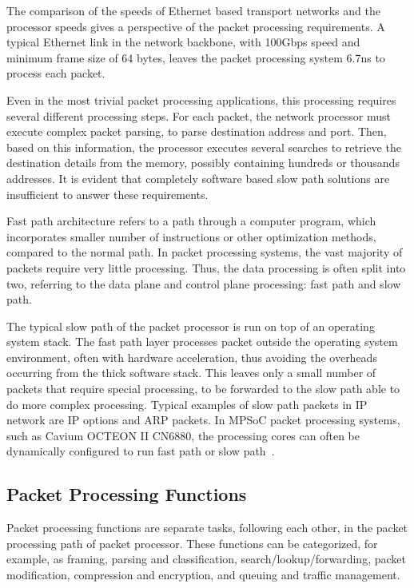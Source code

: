 The comparison of the speeds of Ethernet based transport networks and the processor speeds gives a perspective of the packet processing requirements. A typical Ethernet link in the network backbone, with 100Gbps speed and minimum frame size of 64 bytes, leaves the packet processing system 6.7ns to process each packet.~\cite{Giladi:2008:Network}

Even in the most trivial packet processing applications, this processing requires several different processing steps. For each packet, the network processor must execute complex packet parsing, to parse destination address and port. Then, based on this information, the processor executes several searches to retrieve the destination details from the memory, possibly containing hundreds or thousands addresses. It is evident that completely software based slow path solutions are insufficient to answer these requirements.~\cite{Giladi:2008:Network}

Fast path architecture refers to a path through a computer program, which incorporates smaller number of instructions or other optimization methods, compared to the normal path. In packet processing systems, the vast majority of packets require very little processing. Thus, the data processing is often split into two, referring to the data plane and control plane processing: fast path and slow path.~\cite{6wind:2016:FP, Giladi:2008:Network}

The typical slow path of the packet processor is run on top of an operating system stack. The fast path layer processes packet outside the operating system environment, often with hardware acceleration, thus avoiding the overheads occurring from the thick software stack. This leaves only a small number of packets that require special processing, to be forwarded to the slow path able to do more complex processing. Typical examples of slow path packets in IP network are IP options and ARP packets. In MPSoC packet processing systems, such as Cavium OCTEON II CN6880, the processing cores can often be dynamically configured to run fast path or slow path~\cite{cavium:2010:fundamentals}.~\cite{6wind:2016:FP, Giladi:2008:Network}

\subsection{Packet Processing Functions}
Packet processing functions are separate tasks, following each other, in the packet processing path of packet processor. These functions can be categorized, for example, as framing, parsing and classification, search/lookup/forwarding, packet modification, compression and encryption, and queuing and traffic management.~\cite{Giladi:2008:Network}

